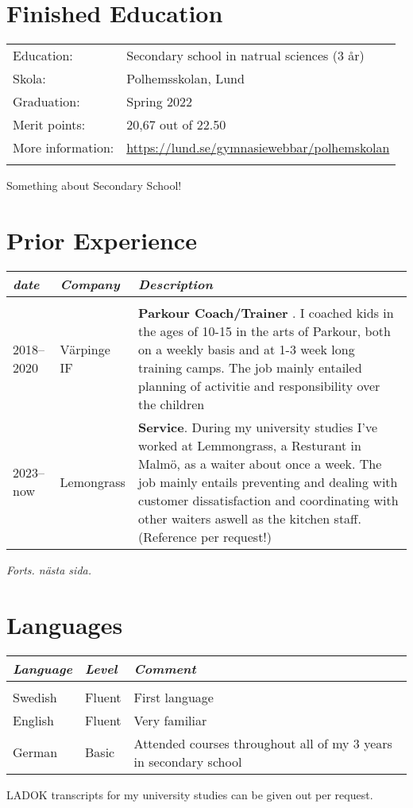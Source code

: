\documentclass{cv}
\begin{document}
\section{Finished Education}
\begin{tabular*}{\textwidth}{p{5cm} l}
	Education:     & Secondary school in natrual sciences (3 år) \\
	Skola:         & Polhemsskolan, Lund \\
	Graduation:    & Spring 2022 \\
	Merit points:  & 20,67 out of 22.50 \\
	More information:& \url{https://lund.se/gymnasiewebbar/polhemskolan}\\ \\
\end{tabular*}

Something about Secondary School!

\section{Prior Experience}

\begin{tabular*}{\textwidth}{p{3.4cm}   p{3.5cm}  p{11cm}  }
	\textit{date}  & \textit{Company}  & \textit{Description} \\ \hline \\

	2018--2020 & Värpinge IF & \textbf{Parkour Coach/Trainer }. I coached kids in the ages of 10-15 in the arts of Parkour, both on a weekly basis and at 1-3 week long training camps. The job mainly entailed planning of activitie and responsibility over the children \\

	2023--now & Lemongrass & \textbf{Service}. During my university studies I've worked at Lemmongrass, a Resturant in Malmö, as a waiter about once a week. The job mainly entails preventing and dealing with customer dissatisfaction and coordinating with other waiters aswell as the kitchen staff. (Reference per request!)

\end{tabular*}

\vspace{2em}\hfill\textit{Forts. nästa sida.}


\section{Languages}

\begin{tabular*}{\textwidth}{p{2.7cm}   p{3.7cm} p{11cm}  }
	\textit{Language} & \textit{Level} & \textit{Comment} \\ \hline \\
	Swedish & Fluent  & First language \\
	English & Fluent  & Very familiar  \\
	German  & Basic   & Attended courses throughout all of my 3 years in secondary school \\
\end{tabular*}

\vspace{1em} LADOK transcripts for my university studies can be given out per request.
\end{document}
